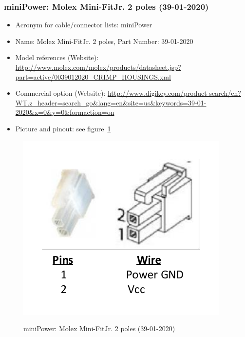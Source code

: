 \subsubsection{miniPower: Molex Mini-Fit\textregistered Jr. 2 poles (39-01-2020)} \label{DEVICE:miniPower}
\begin{itemize}
  \item Acronym for cable/connector lists: miniPower
  \item Name: Molex Mini-Fit\textregistered Jr. 2 poles, Part Number: 39-01-2020
  \item Model references (Website): \href{http://www.molex.com/molex/products/datasheet.jsp?part=active/0039012020\_CRIMP\_HOUSINGS.xml}{http://www.molex.com/molex/products/datasheet.jsp?part=active/0039012020\_CRIMP\_HOUSINGS.xml}
  \item Commercial option (Website): \href{http://www.digikey.com/product-search/en?WT.z\_header=search\_go\&lang=en\&site=us\&keywords=39-01-2020\&x=0\&y=0\&formaction=on}{http://www.digikey.com/product-search/en?WT.z\_header=search\_go\&lang=en\&site=us\&keywords=39-01-2020\&x=0\&y=0\&formaction=on}
  \item Picture and pinout: see figure~\ref{FIG:DEVICEminiPower}
\end{itemize}
\begin{figure}
  \centering
  \includegraphics[angle=90,width=1\columnwidth]{figs/body02/FIGDEVICEminiPower.pdf}\\
  \caption[miniPower: Molex Mini-Fit\textregistered Jr. 2 poles (39-01-2020)]{miniPower: Molex Mini-Fit\textregistered Jr. 2 poles (39-01-2020)}
  \label{FIG:DEVICEminiPower}
\end{figure}

